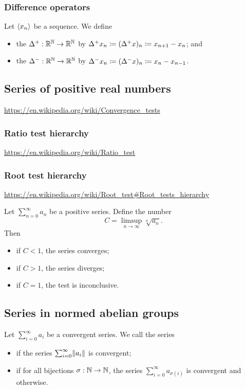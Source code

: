 \subsubsection{Difference operators}
\begin{definition}
Let $\left\langle x_n \right\rangle$ be a sequence. We define
\begin{itemize}
\item the  $\Delta^+: \mathbb{R}^{\mathbb{N}} \to \mathbb{R}^{\mathbb{N}}$ by $\Delta^+ x_n \coloneqq (\Delta^+x)_n \coloneqq x_{n+1} - x_n$; and
\item the  $\Delta^-: \mathbb{R}^{\mathbb{N}} \to \mathbb{R}^{\mathbb{N}}$ by $\Delta^- x_n \coloneqq (\Delta^-x)_n \coloneqq x_{n} - x_{n-1}$.
\end{itemize}
\end{definition}

\subsection{Series of positive real numbers}
\url{https://en.wikipedia.org/wiki/Convergence_tests}
\subsubsection{Ratio test hierarchy}
\url{https://en.wikipedia.org/wiki/Ratio_test}
\subsubsection{Root test hierarchy}
\url{https://en.wikipedia.org/wiki/Root_test#Root_tests_hierarchy}

\begin{proposition} \label{rootTest}
Let $\sum_{n=0}^\infty a_n$ be a positive series. Define the number
\[ C = \limsup_{n\to \infty}\sqrt[n]{a_n}. \]
Then
\begin{itemize}
\item if $C<1$, the series converges;
\item if $C>1$, the series diverges;
\item if $C=1$, the test is inconclusive.
\end{itemize}
\end{proposition}


\subsection{Series in normed abelian groups}
\begin{definition}
Let $\sum_{i=0}^\infty a_i$ be a convergent series. We call the series
\begin{itemize}
\item {} if the series $\sum_{i=0}^\infty \lVert a_i\rVert$ is convergent;
\item {} if for all bijections $\sigma: \mathbb{N}\to \mathbb{N}$, the series $\sum_{i=0}^\infty a_{\sigma(i)}$ is convergent and  otherwise.
\end{itemize}
\end{definition}

